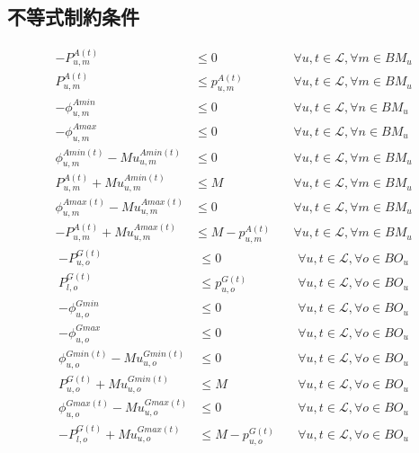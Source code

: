 \documentclass[a4j,10.5pt,fleqn]{jarticle}
\begin{document}
\subsection{不等式制約条件}
\begin{align}
-P_{u,m}^{A(t)}&\le 0&\quad \forall u,t\in\mathcal{L},\forall m\in BM_u \tag{m-1}\\
P_{u,m}^{A(t)}&\le p_{u,m}^{A(t)}&\quad \forall u,t\in\mathcal{L},\forall m\in BM_u \tag{m-2}\\
 -\phi_{u,m}^{Amin}&\le 0&\quad \forall u,t\in\mathcal{L},\forall n\in BM_u  \tag{m-3}\\
 -\phi_{u,m}^{Amax}&\le 0&\quad \forall u,t\in\mathcal{L},\forall n\in BM_u  \tag{m-4}\\
\phi_{u,m}^{Amin(t)} - Mu^{Amin(t)}_{u,m} &\le0&\quad \forall u,t\in\mathcal{L},\forall m\in BM_u  \tag{m-5}\\
P_{u,m}^{A(t)}+Mu^{Amin(t)}_{u,m} &\le M&\quad \forall u,t\in\mathcal{L},\forall m\in BM_u \tag{m-6}\\
\phi_{u,m}^{Amax(t)}-Mu^{Amax(t)}_{u,m}&\le0&\quad \forall u,t\in\mathcal{L},\forall m\in BM_u \tag{m-7}\\
-P_{u,m}^{A(t)}+Mu^{Amax(t)}_{u ,m}&\le M-p_{u,m}^{A(t)}&\quad \forall u,t\in\mathcal{L},\forall m\in BM_u \tag{m-8}
\end{align}
\begin{align}
-P_{u,o}^{G(t)}&\le 0&\quad \forall u,t\in\mathcal{L},\forall o\in BO_u \tag{o-1}\\
P_{l,o}^{G(t)}&\le p_{u,o}^{G(t)}&\quad \forall u,t\in\mathcal{L},\forall o\in BO_u \tag{o-2}\\
 -\phi_{u,o}^{Gmin}&\le 0&\quad \forall u,t\in\mathcal{L},\forall o\in BO_u  \tag{o-3}\\
 -\phi_{u,o}^{Gmax}&\le 0&\quad \forall u,t\in\mathcal{L},\forall o\in BO_u  \tag{o-4}\\
 \phi_{u,o}^{Gmin(t)} - Mu^{Gmin(t)}_{u,o} &\le0&\quad \forall u,t\in\mathcal{L},\forall o\in BO_u \tag{o-5}\\
P_{u,o}^{G(t)}+Mu^{Gmin(t)}_{u,o} &\le M&\quad \forall u,t\in\mathcal{L},\forall o\in BO_u \tag{o-6}\\
\phi_{u,o}^{Gmax(t)}-Mu^{Gmax(t)}_{u,o}&\le0&\quad \forall u,t\in\mathcal{L},\forall o\in BO_u \tag{o-7}\\
-P_{l,o}^{G(t)}+Mu^{Gmax(t)}_{u,o}&\le M-p_{u,o}^{G(t)}&\quad \forall u,t\in\mathcal{L},\forall o\in BO_u \tag{o-8}
\end{align}
\end{document}
